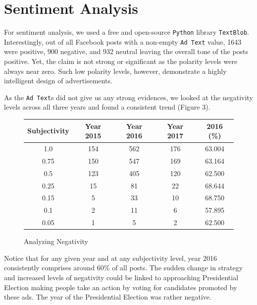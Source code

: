 \documentclass{article}
\begin{document}

\section*{\centering Sentiment Analysis}

For sentiment analysis, we used a free and open-source \texttt{Python} library
\texttt{TextBlob}. Interestingly, out of all Facebook posts with a non-empty
\texttt{Ad Text} value, 1643 were positive, 900 negative, and 932 neutral
leaving the overall tone of the posts positive. Yet, the claim is not strong
or significant as the polarity levels were always near zero. Such low polarity
levels, however, demonstrate a highly intelligent design of advertisements.

\bigskip

As the \texttt{Ad Text}s did not give us any strong evidences, we looked at the
negativity levels across all three years and found a consistent trend (Figure 3).

\begin{figure}[H]
  \centering
  \begin{tabular}{*{5}{c}}
    \toprule
    Subjectivity & Year 2015 & Year 2016 & Year 2017 & 2016 (\%)\\
    \midrule
    1.0  & 154 & 562 & 176 & 63.004\\
    \midrule
    0.75 & 150 & 547 & 169 & 63.164\\
    \midrule
    0.5  & 123 & 405 & 120 & 62.500\\
    \midrule
    0.25 & 15 & 81 & 22 & 68.644\\
    \midrule
    0.15 & 5 & 33 & 10 & 68.750\\
    \midrule
    0.1  & 2 & 11 & 6 & 57.895\\
    \midrule
    0.05 & 1 & 5 & 2 & 62.500\\
    \bottomrule
  \end{tabular}
  \caption{Analyzing Negativity}
\end{figure}

Notice that for any given year and at any subjectivity level, year 2016
consistently comprises around 60\% of all posts. The sudden change in strategy
and increased levels of negativity could be linked to approaching Presidential
Election making people take an action by voting for candidates promoted by
these ads. The year of the Presidential Election was rather negative.
\end{document}

